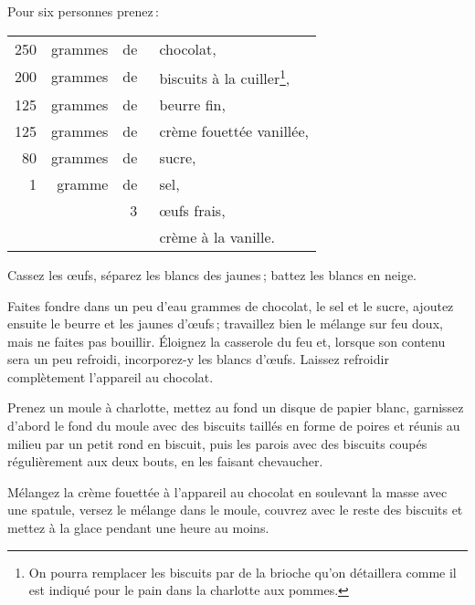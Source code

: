 Pour six personnes prenez :

\footnotesize
\begin{longtable}{rrrp{16em}}
    250 & grammes & de & chocolat,                                                                        \\
    200 & grammes & de & biscuits à la cuiller\footnote{ On pourra remplacer les biscuits
                         par de la brioche qu'on détaillera comme il est indiqué pour le
                         pain dans la charlotte aux pommes.},                                             \\
    125 & grammes & de & beurre fin,                                                                      \\
    125 & grammes & de & crème fouettée vanillée,                                                         \\
     80 & grammes & de & sucre,                                                                           \\
      1 & gramme  & de & sel,                                                                             \\
        &         &  3 & œufs frais,                                                                      \\
        &         &    & crème à la vanille.                                                              \\
\end{longtable}
\normalsize

Cassez les œufs, séparez les blancs des jaunes ; battez les blancs en neige.

Faites fondre dans un peu d'eau {\mmm} grammes de chocolat, le sel et le
sucre, ajoutez ensuite le beurre et les jaunes d'œufs ; travaillez bien le
mélange sur feu doux, mais ne faites pas bouillir. Éloignez la casserole du feu
et, lorsque son contenu sera un peu refroidi, incorporez-y les blancs d'œufs.
Laissez refroidir complètement l'appareil au chocolat.

\label{pg0865} \hypertarget{p0865}{}
Prenez un moule à charlotte, mettez au fond un disque de papier blanc,
garnissez d'abord le fond du moule avec des biscuits taillés en forme de poires
et réunis au milieu par un petit rond en biscuit, puis les parois avec des
biscuits coupés régulièrement aux deux bouts, en les faisant chevaucher.

Mélangez la crème fouettée à l'appareil au chocolat en soulevant la masse avec
une spatule, versez le mélange dans le moule, couvrez avec le reste des
biscuits et mettez à la glace pendant une heure au moins.

